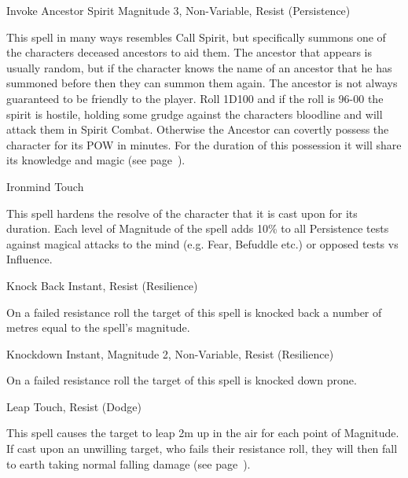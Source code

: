 \begin{rpg-spell}
{Invoke Ancestor Spirit}
{Magnitude 3, Non-Variable, Resist (Persistence)}

This spell in many ways resembles Call Spirit, but specifically summons one of the characters deceased ancestors to aid them. The ancestor that appears is usually random, but if the character knows the name of an ancestor that he has summoned before then they can summon them again. The ancestor is not always guaranteed to be friendly to the player. Roll 1D100 and if the roll is 96-00 the spirit is hostile, holding some grudge against the characters bloodline and will attack them in Spirit Combat. Otherwise the Ancestor can covertly possess the character for its POW in minutes. For the duration of this possession it will share its knowledge and magic (see page~\pageref{sec:spirits}).
\end{rpg-spell}


\begin{rpg-spell}
{Ironmind}
{Touch}

This spell hardens the resolve of the character that it is cast upon for its duration. Each level of Magnitude of the spell adds 10\% to all Persistence tests against magical attacks to the mind (e.g. Fear, Befuddle etc.) or opposed tests vs Influence.
\end{rpg-spell}


\begin{rpg-spell}
{Knock Back}
{Instant, Resist (Resilience)}

On a failed resistance roll the target of this spell is knocked back a number of metres equal to the spell’s magnitude.
\end{rpg-spell}


\begin{rpg-spell}
{Knockdown}
{Instant, Magnitude 2, Non-Variable, Resist (Resilience)}

On a failed resistance roll the target of this spell is knocked down prone.
\end{rpg-spell}


\begin{rpg-spell}
{Leap}
{Touch, Resist (Dodge)}

This spell causes the target to leap 2m up in the air for each point of Magnitude. If cast upon an unwilling target, who fails their resistance roll, they will then fall to earth taking normal falling damage (see page~\pageref{ssec:falling}).
\end{rpg-spell}


